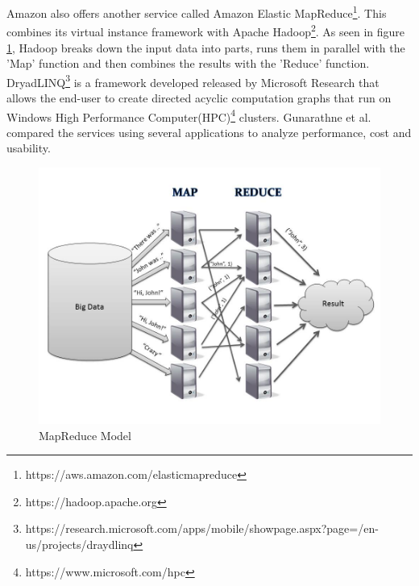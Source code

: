 \documentclass[12pt]{article}
\begin{document}
Amazon also offers another service called Amazon Elastic
MapReduce\footnote{https://aws.amazon.com/elasticmapreduce}. This combines its
virtual instance framework with Apache
Hadoop\footnote{https://hadoop.apache.org}. As seen in figure \ref{fig:map},
Hadoop breaks down the input data into parts, runs them in parallel with the
'Map' function and then combines the results with the 'Reduce' function.
DryadLINQ\footnote{https://research.microsoft.com/apps/mobile/showpage.aspx?page=/en-us/projects/draydlinq}
is a framework developed released by Microsoft Research that allows the end-user
to create directed acyclic computation graphs that run on Windows High
Performance Computer(HPC)\footnote{https://www.microsoft.com/hpc} clusters.
Gunarathne et al. compared the services using several applications to analyze
performance, cost and usability.

\begin{figure}
    \begin{center}
        \includegraphics{figures/MapReduce.jpg}
    \end{center}
    \caption{MapReduce Model}
    \label{fig:map}
\end{figure}
\end{document}
